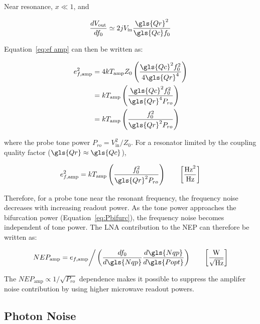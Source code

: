 Near resonance, $x \ll 1$, and

\begin{equation}
  \frac{dV_{\mathrm{out}}}{df_{0}} \simeq 2jV_{\mathrm{in}}\frac{\gls{Qr}^{2}}{\gls{Qc}f_{0}}
\end{equation}

Equation~\ref{eq:ef amp} can then be written as:

\begin{equation}
  \begin{aligned}
  e_{f,\mathrm{amp}}^{2} &= 4kT_{\mathrm{amp}}Z_{0}\left( \frac{\gls{Qc}^{2}f_{0}^{2}}{4\gls{Qr}^{4}} \right) \\
               &= kT_{\mathrm{amp}}\left( \frac{\gls{Qc}^{2}f_{0}^{2}}{\gls{Qr}^{4}P_{ro}}\right) \\
               &= kT_{\mathrm{amp}}\left( \frac{f_{0}^{2}}{\gls{Qr}^{2}P_{ro}}\right)
  \end{aligned}
\end{equation}

where the probe tone power $P_{ro} = V_{\mathrm{in}}^{2}/Z_{0}$. For a resonator limited by the coupling quality factor ($\gls{Qr} \approx \gls{Qc}$),

\begin{equation}
  e_{f,\mathrm{amp}}^{2} = kT_{\mathrm{amp}}\left( \frac{f_{0}^{2}}{\gls{Qr}^{2}P_{ro}}\right) \qquad \left[ \frac{\mathrm{Hz}^{2}}{\mathrm{Hz}} \right]
\end{equation}

Therefore, for a probe tone near the resonant frequency, the frequency noise decreases with increasing readout power. As the tone power approaches the bifurcation power (Equation~\ref{eq:Pbifurc}), the frequency noise becomes independent of tone power. The LNA contribution to the NEP can therefore be written as:

\begin{equation}\label{eq:NEP amp}
  NEP_{\mathrm{amp}} = e_{f,\mathrm{amp}} \bigg/ \left( \frac{df_{0}}{d\gls{Nqp}}\frac{d\gls{Nqp}}{d\gls{Popt}} \right) \qquad \left[ \frac{\mathrm{W}}{\sqrt{\mathrm{Hz}}} \right]
\end{equation}

The $NEP_{\mathrm{amp}} \propto 1/\sqrt{P_{ro}} $ dependence makes it possible to suppress the amplifer noise contribution by using higher microwave readout powers.

\subsection{Photon Noise} \label{photon noise}

